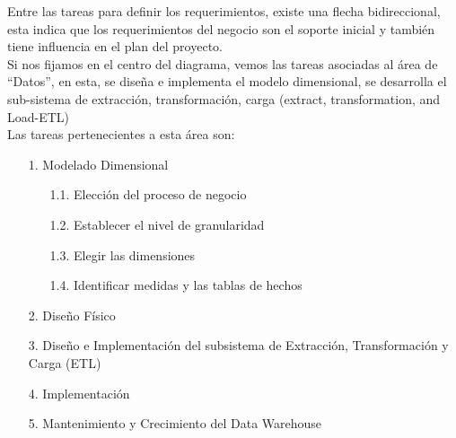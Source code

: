 \documentclass[twoside,twocolumn]{article}
\begin{document}
\begin{enumerate}
Entre las tareas para definir los requerimientos, existe una flecha bidireccional, esta indica que los requerimientos del negocio son el soporte inicial y también tiene influencia en el plan del proyecto.\\

Si nos fijamos en el centro del diagrama, vemos las tareas asociadas al área de “Datos”, en esta, se diseña e implementa el modelo dimensional, se desarrolla el sub-sistema de extracción, transformación, carga (extract, transformation, and Load-ETL) \\

Las tareas pertenecientes a esta área son:

\begin{itemize}
\item [1.] Modelado Dimensional
\begin{itemize}
\item [1.1.] Elección del proceso de negocio
\item [1.2.] Establecer el nivel de granularidad
\item [1.3.] Elegir las dimensiones
\item [1.4.] Identificar medidas y las tablas de hechos
\end{itemize}
\item [2.] Diseño Físico
\item [3.] Diseño e Implementación del subsistema de Extracción, Transformación y Carga (ETL)
\item [4.] Implementación
\item [5.] Mantenimiento y Crecimiento del Data Warehouse



\end{itemize}


	
\end{enumerate}







\end{document}
